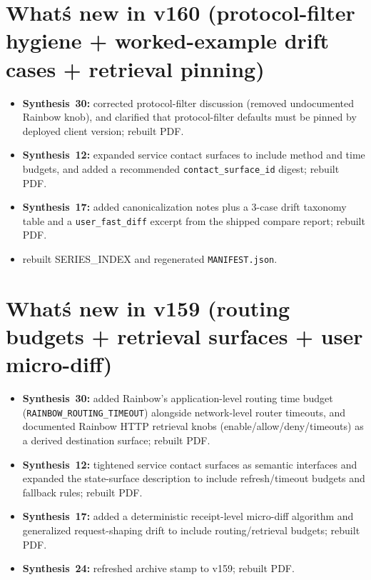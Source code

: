 \documentclass[11pt]{article}
\begin{document}
\section{What\'s new in v160 (protocol-filter hygiene + worked-example drift cases + retrieval pinning)}
\begin{itemize}[leftmargin=*]
\item \textbf{Synthesis~30:} corrected protocol-filter discussion (removed undocumented Rainbow knob), and clarified that protocol-filter defaults must be pinned by deployed client version; rebuilt PDF.
\item \textbf{Synthesis~12:} expanded service contact surfaces to include method and time budgets, and added a recommended \texttt{contact\_surface\_id} digest; rebuilt PDF.
\item \textbf{Synthesis~17:} added canonicalization notes plus a 3-case drift taxonomy table and a \texttt{user\_fast\_diff} excerpt from the shipped compare report; rebuilt PDF.
\item rebuilt SERIES\_INDEX and regenerated \texttt{MANIFEST.json}.
\end{itemize}

\section{What\'s new in v159 (routing budgets + retrieval surfaces + user micro-diff)}
\begin{itemize}[leftmargin=*]
\item \textbf{Synthesis~30:} added Rainbow's application-level routing time budget (\texttt{RAINBOW\_ROUTING\_TIMEOUT}) alongside network-level router timeouts, and documented Rainbow HTTP retrieval knobs (enable/allow/deny/timeouts) as a derived destination surface; rebuilt PDF.
\item \textbf{Synthesis~12:} tightened service contact surfaces as semantic interfaces and expanded the state-surface description to include refresh/timeout budgets and fallback rules; rebuilt PDF.
\item \textbf{Synthesis~17:} added a deterministic receipt-level micro-diff algorithm and generalized request-shaping drift to include routing/retrieval budgets; rebuilt PDF.
\item \textbf{Synthesis~24:} refreshed archive stamp to v159; rebuilt PDF.
\end{itemize}
\end{document}

